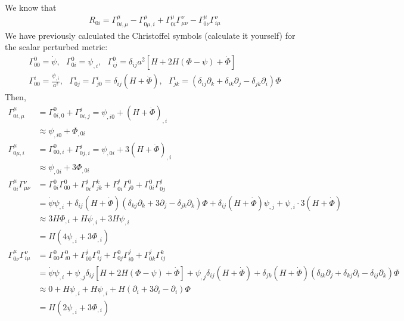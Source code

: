 \documentclass[11pt]{article}
\begin{document}
We know that 
\begin{align*}
    R_{0i} = \Gamma^\mu_{0i, \mu} - \Gamma^\mu_{0\mu, i} + \Gamma^\mu_{0i}\Gamma^\nu_{\mu\nu} - \Gamma^\mu_{0\nu}\Gamma^\nu_{i\mu}
\end{align*}
We have previously calculated the Christoffel symbols (calculate it yourself) for the scalar perturbed metric: 
\begin{align*}
    \Gamma^0_{00} = \dot{\psi}, ~~~ \Gamma^0_{0i} = \psi_{,i}, ~~~ \Gamma^0_{ij} = \delta_{ij} a^2 [H + 2H (\Phi - \psi)  + \dot{\Phi}] \\
    \Gamma^i_{00} = \frac{\psi_{,i}}{a^2}, ~~~ \Gamma^i_{0j} = \Gamma^i_{j0} = \delta_{ij} (H + \dot{\Phi}), ~~~ \Gamma^i_{jk} = (\delta_{ij} \partial_k + \delta_{ik}\partial_j - \delta_{jk}\partial_i) \Phi 
\end{align*}
Then, 
\begin{align*}
    \Gamma^\mu_{0i, \mu} &= \Gamma^0_{0i, 0} + \Gamma^{j}_{0i, j} = \psi_{,i0} + (H+\dot{\Phi})_{,i} \\ 
    &\approx \psi_{,i0} + \Phi_{,0i} \\
    \Gamma^\mu_{0\mu, i} &= \Gamma^0_{00, i} + \Gamma^j_{0j, i} = \psi_{,0i} + 3(H + \dot{\Phi})_{,i} \\
    &\approx \psi_{,0i} + 3\Phi_{, 0i} \\
    \Gamma^\mu_{0i} \Gamma^\nu_{\mu\nu} &= \Gamma^0_{0i}\Gamma^0_{00} + \Gamma^j_{0i}\Gamma^k_{jk} + \Gamma^j_{0i}\Gamma^0_{j0} + \Gamma^0_{0i} \Gamma^j_{0j} \\
    &= \dot{\psi}\psi_{,i} + \delta_{ij}(H + \dot{\Phi})(\delta_{kj}\partial_k + 3\partial_j - \delta_{jk}\partial_k)\Phi + \delta_{ij}(H + \dot{\Phi})\psi_{,j} + \psi_{,i}\cdot 3(H + \dot{\Phi}) \\
    &\approx 3H \Phi_{,i} + H \psi_{,i} + 3H \psi_{,i} \\
    &= H (4\psi_{,i } + 3\Phi_{,i}) \\
    \Gamma^\mu_{0\nu}\Gamma^\nu_{i\mu} &= \Gamma^0_{00}\Gamma^0_{i0} + \Gamma^j_{00}\Gamma^0_{ij} + \Gamma^0_{0j}\Gamma^j_{i0} + \Gamma^j_{0k}\Gamma^k_{ij} \\
    &= \dot{\psi}\psi_{,i} + \psi_{,j} \delta_{ij}[H + 2H (\Phi - \psi) + \dot{\Phi}] + \psi_{,j} \delta_{ij} (H + \dot{\Phi}) + \delta_{jk} (H + \dot{\Phi})(\delta_{ik}\partial_j + \delta_{kj}\partial_i - \delta_{ij}\partial_k)\Phi \\
    &\approx 0 + H \psi_{,i} + H \psi_{,i}  + H(\partial_i + 3 \partial_i - \partial_i) \Phi \\
    &=H( 2 \psi_{,i} + 3\Phi_{,i})
\end{align*}
\end{document}

